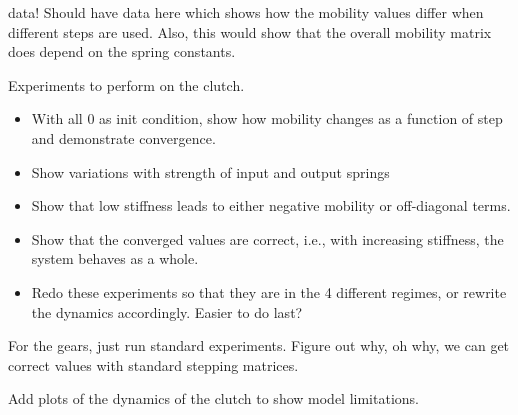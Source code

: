 \documentclass[10pt,notitlepage,abstracton]{scrartcl}
\theoremstyle{plain}
\theoremstyle{plain}
\theoremstyle{plain}
\begin{document}
\begin{anfxnote}{data!}
  Should have data here which shows how the mobility values differ when
  different steps are used.  Also, this would show that the overall
  mobility matrix does depend on the spring constants.  


  Experiments to perform on the clutch. 
  \begin{itemize}
  \item  With all $0$ as init condition, show how mobility changes as a
    function of step and demonstrate convergence. 
  \item Show variations with strength of input and output springs 
  \item Show that low stiffness leads to either negative mobility or
    off-diagonal terms. 
  \item Show that the converged values are correct, i.e., with increasing
    stiffness, the system behaves as a whole. 
  \item Redo these experiments so that they are in the 4 different regimes,
    or rewrite the dynamics accordingly.  Easier to do last? 
  \end{itemize}


  For the gears, just run standard experiments.  Figure out why, oh why, we
  can get correct values with standard stepping matrices. 

  Add plots of the dynamics of the clutch to show model limitations. 

\end{anfxnote}


  

\end{document}
